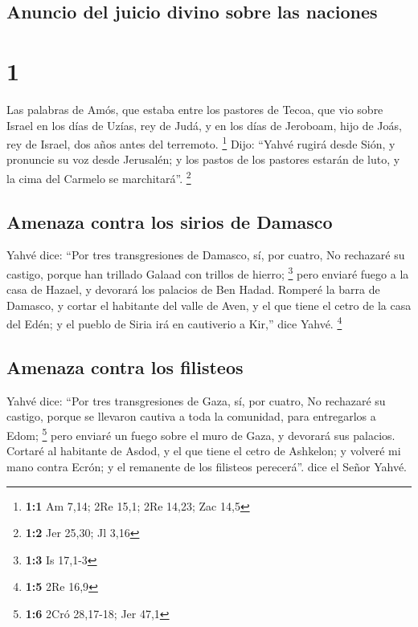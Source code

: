 \hypertarget{anuncio-del-juicio-divino-sobre-las-naciones}{%
\subsection{Anuncio del juicio divino sobre las
naciones}\label{anuncio-del-juicio-divino-sobre-las-naciones}}

\hypertarget{section}{%
\section{1}\label{section}}

 Las palabras de Amós, que estaba entre los pastores de
Tecoa, que vio sobre Israel en los días de Uzías, rey de Judá, y en los
días de Jeroboam, hijo de Joás, rey de Israel, dos años antes del
terremoto. \footnote{\textbf{1:1} Am 7,14; 2Re 15,1; 2Re 14,23; Zac 14,5}
 Dijo: ``Yahvé rugirá desde Sión, y pronuncie su voz desde
Jerusalén; y los pastos de los pastores estarán de luto, y la cima del
Carmelo se marchitará''. \footnote{\textbf{1:2} Jer 25,30; Jl 3,16}

\hypertarget{amenaza-contra-los-sirios-de-damasco}{%
\subsection{Amenaza contra los sirios de
Damasco}\label{amenaza-contra-los-sirios-de-damasco}}

 Yahvé dice: ``Por tres transgresiones de Damasco, sí, por
cuatro, No rechazaré su castigo, porque han trillado Galaad con trillos
de hierro; \footnote{\textbf{1:3} Is 17,1-3}  pero enviaré
fuego a la casa de Hazael, y devorará los palacios de Ben Hadad.
 Romperé la barra de Damasco, y cortar el habitante del
valle de Aven, y el que tiene el cetro de la casa del Edén; y el pueblo
de Siria irá en cautiverio a Kir,'' dice Yahvé. \footnote{\textbf{1:5}
  2Re 16,9}

\hypertarget{amenaza-contra-los-filisteos}{%
\subsection{Amenaza contra los
filisteos}\label{amenaza-contra-los-filisteos}}

 Yahvé dice: ``Por tres transgresiones de Gaza, sí, por
cuatro, No rechazaré su castigo, porque se llevaron cautiva a toda la
comunidad, para entregarlos a Edom; \footnote{\textbf{1:6} 2Cró
  28,17-18; Jer 47,1}  pero enviaré un fuego sobre el muro
de Gaza, y devorará sus palacios.  Cortaré al habitante de
Asdod, y el que tiene el cetro de Ashkelon; y volveré mi mano contra
Ecrón; y el remanente de los filisteos perecerá''. dice el Señor Yahvé.

